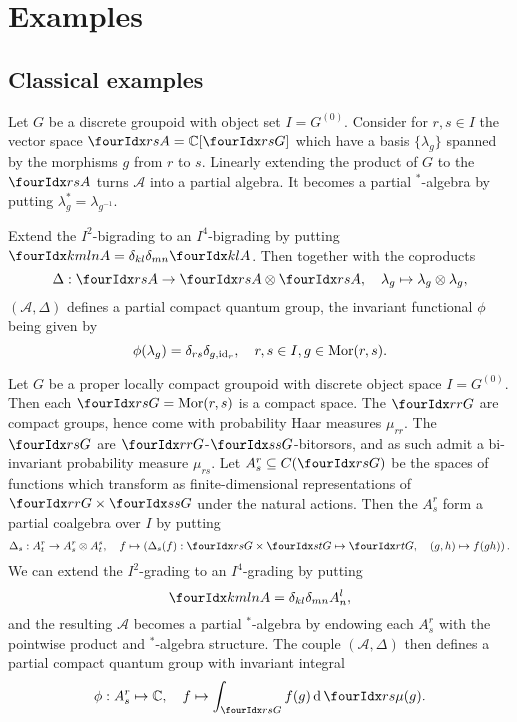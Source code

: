 
\section{Examples}

\subsection{Classical examples}

\begin{Exa} Let $G$ be a discrete groupoid with object set $I = G^{(0)}$. Consider for $r,s\in I$ the vector space $\Gru{A}{r}{s}= \mathbb{C}\lbrack \Gru{G}{r}{s}\rbrack$ which have a basis $\{\lambda_g\}$ spanned by the morphisms $g$ from $r$ to $s$. Linearly extending the product of $G$ to the $\Gru{A}{r}{s}$ turns $\mathscr{A}$ into a partial algebra. It becomes a partial $^*$-algebra by putting $\lambda_g^* = \lambda_{g^{-1}}$. 

Extend the $I^2$-bigrading to an $I^4$-bigrading by putting $\Gr{A}{k}{l}{m}{n} = \delta_{kl}\delta_{mn}\Gru{A}{k}{l}$. Then together with the coproducts \[ \Delta: \Gru{A}{r}{s}\rightarrow \Gru{A}{r}{s}\otimes \Gru{A}{r}{s},\quad \lambda_g\mapsto \lambda_g\otimes \lambda_g,\] $(\mathscr{A},\Delta)$ defines a partial compact quantum group, the invariant functional $\phi$ being given by \[\phi(\lambda_g) = \delta_{rs}\delta_{g,\operatorname{id}_r},\quad r,s\in I,g\in \mathrm{Mor}(r,s).\]
\end{Exa}

\begin{Exa} Let $G$ be a proper locally compact groupoid with discrete object space $I=G^{(0)}$. Then each $\Gru{G}{r}{s} = \Mor(r,s)$ is a compact space. The $\Gru{G}{r}{r}$ are compact groups, hence come with probability Haar measures $\mu_{rr}$. The $\Gru{G}{r}{s}$ are $\Gru{G}{r}{r}$-$\Gru{G}{s}{s}$-bitorsors, and as such admit a bi-invariant probability measure $\mu_{rs}$. Let $A^r_s \subseteq C(\Gru{G}{r}{s})$ be the spaces of functions which transform as finite-dimensional representations of $\Gru{G}{r}{r}\times \Gru{G}{s}{s}$ under the natural actions. Then the $A^r_s$ form a partial coalgebra over $I$ by putting \[\Delta_{s}: A^r_t \rightarrow A^r_s\otimes A^s_t,\quad f\mapsto \left(\Delta_s(f):\Gru{G}{r}{s}\times \Gru{G}{s}{t}\mapsto \Gru{G}{r}{t},\quad (g,h)\mapsto f(gh)\right).\] We can extend the $I^2$-grading to an $I^4$-grading by putting \[\Gr{A}{k}{l}{m}{n} = \delta_{kl}\delta_{mn} A^l_n,\] and the resulting $\mathscr{A}$ becomes a partial $^*$-algebra by endowing each $A^r_s$ with the pointwise product and $^*$-algebra structure. The couple $(\mathscr{A},\Delta)$ then defines a partial compact quantum group with invariant integral \[\phi: A^r_s \mapsto \C,\quad f\mapsto \int_{\Gru{G}{r}{s}} f(g) \rd \Gru{\mu}{r}{s}(g).\]

\end{Exa}

